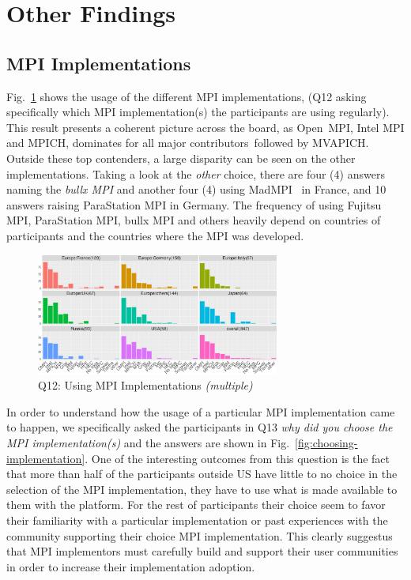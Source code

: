 \documentclass[preprint,5p,times]{elsarticle}
\def\myquote#1{{\it #1}}
\newcommand{\revision}[2]{{\color{blue}#2}}
\def\mcountries{major contributors\xspace{}}%
\begin{document}
\section{Other Findings}

\subsection{MPI Implementations}

 Fig.~\ref{fig:using-implementations} shows the usage of the different MPI
 implementations, (Q12 asking specifically which MPI implementation(s) the
 participants are using regularly). This result presents a coherent picture
 across the board, as Open~MPI, Intel MPI and MPICH, dominates \revision{in}{for} all
 \mcountries\ followed by MVAPICH. Outside these top contenders, a large
 disparity can be seen on the other implementations. Taking a look at the
 \myquote{other} choice, there are four (4) answers naming the \myquote{bullx
 MPI} and another four (4) using MadMPI~\cite{madmpi} in France, and 10 answers
 raising ParaStation MPI in Germany. The frequency of using Fujitsu MPI,
 ParaStation MPI, bullx MPI and others heavily depend on countries of
 participants and the countries where the MPI was developed.

  \begin{figure}[tb]
    \begin{center}
      \includegraphics[width=8.0cm]{R-scripts/Q12.pdf}
      \vspace{-1.5mm}
      \caption{Q12: Using MPI Implementations {\it(multiple)}}
      \label{fig:using-implementations}
\vspace{-3mm}%
    \end{center}
  \end{figure}

In order to understand how the usage of a particular MPI implementation came to
happen, we specifically asked the participants in Q13 \myquote{why did you
choose the MPI implementation(s)} and the answers are shown in
Fig.~\ref{fig:choosing-implementation}.
%
One of the interesting outcomes from this question is the fact that more than
half of the participants outside US have little to no choice in the selection of
the MPI implementation, they have to use what is made available to them with the
platform. For the rest of participants their choice seem to favor their
familiarity with a particular implementation or past experiences with the
community supporting their choice MPI implementation.
%
This clearly suggestus that MPI implementors must carefully build and support
their user communities in order to increase their implementation adoption.
\end{document}
